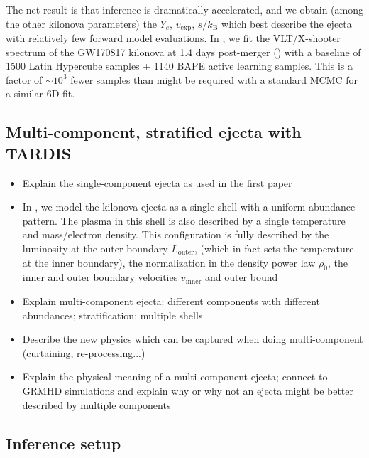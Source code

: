 \documentclass[twocolumn, twocolappendix]{aastex63}
\begin{document}
The net result is that inference is dramatically accelerated, and we obtain (among the other kilonova parameters) the $Y_e$, $v_{\mathrm{exp}}$, $s / k_{\mathrm{B}}$ which best describe the ejecta with relatively few forward model evaluations. In \cite{vieira23}, we fit the VLT/X-shooter spectrum of the GW170817 kilonova at 1.4 days post-merger (\citealt{pian17, smartt17}) with a baseline of 1500 Latin Hypercube samples + 1140 BAPE active learning samples. This is a factor of $\sim 10^3$ fewer samples than might be required with a standard MCMC for a similar 6D fit.

\subsection{Multi-component, stratified ejecta with \textsc{TARDIS}}\label{ssc:multi-component-TARDIS}

\begin{itemize}

    \item Explain the single-component ejecta as used in the first paper

    \item In \cite{vieira23}, we model the kilonova ejecta as a single shell with a uniform abundance pattern. The plasma in this shell is also described by a single temperature and mass/electron density. This configuration is fully described by the luminosity at the outer boundary $L_{\mathrm{outer}}$, (which in fact sets the temperature at the inner boundary), the normalization in the density power law $\rho_0$, the inner and outer boundary velocities $v_{\mathrm{inner}}$ and outer bound

    \item Explain multi-component ejecta: different components with different abundances; stratification; multiple shells

    \item Describe the new physics which can be captured when doing multi-component (curtaining, re-processing...)

    \item Explain the physical meaning of a multi-component ejecta; connect to GRMHD simulations and explain why or why not an ejecta might be better described by multiple components

\end{itemize}



\subsection{Inference setup}\label{ssc:inference-setup}
\end{document}
